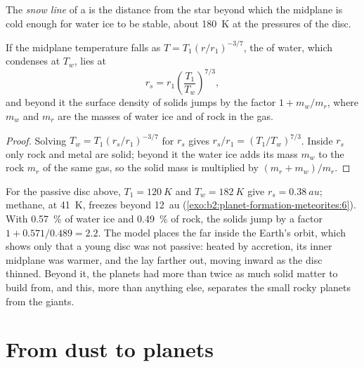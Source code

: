 \begin{definition}\label{def:b2:planet-formation-meteorites:snow-line}
The \emph{snow line} of a  is the distance
from the star beyond which the midplane is cold enough for water ice to be
stable, about \qty{180}{K} at the pressures of the disc.
\end{definition}

\begin{proposition}
\label{prop:b2:planet-formation-meteorites:snow-line}
If the midplane temperature falls as $T = T_1 (r/r_1)^{-3/7}$, the  of
water, which condenses at $T_w$, lies at
\[
  r_s = r_1 \left(\frac{T_1}{T_w}\right)^{7/3},
\]
and beyond it the surface density of solids jumps by the factor $1 + m_w/m_r$,
where $m_w$ and $m_r$ are the masses of water ice and of rock in the gas.
\end{proposition}

\begin{proof}
Solving $T_w = T_1 (r_s/r_1)^{-3/7}$ for $r_s$ gives
$r_s/r_1 = (T_1/T_w)^{7/3}$. Inside $r_s$ only rock and metal are solid; beyond
it the water ice adds its mass $m_w$ to the rock $m_r$ of the same gas, so the
solid mass is multiplied by $(m_r + m_w)/m_r$.
\end{proof}

For the passive disc above, $T_1 = \qty{120}{K}$ and $T_w = \qty{182}{K}$ give
$r_s = \qty{0.38}{au}$; methane, at \qty{41}{K}, freezes beyond \qty{12}{au}
(\cref{exo:b2:planet-formation-meteorites:6}). With \qty{0.57}{\percent} of water ice and \qty{0.49}{\percent}
of rock, the solids jump by a factor $1 + 0.571/0.489 = 2.2$. The model
places the  far inside the Earth's orbit, which shows only that a
young disc was not passive: heated by accretion, its inner midplane was warmer,
and the  lay farther out, moving inward as the disc thinned. Beyond
it, the planets had more than twice as much solid matter to build from, and
this, more than anything else, separates the small rocky planets from the
giants.

\section{From dust to planets}

